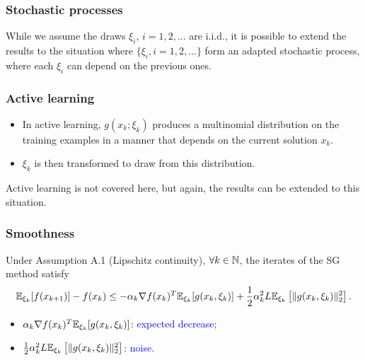 \documentclass[usepdftitle=false, aspectratio=169]{beamer}
\begin{document}
\begin{frame}
\frametitle{Stochastic processes}

While we assume the draws $\xi_i$, $i = 1,2,\ldots$ are i.i.d., it is possible to extend the results to the situation where $\lbrace \xi_i, i = 1,2,\ldots \rbrace$ form an adapted stochastic process, where each $\xi_i$ can depend on the previous ones.

\end{frame}

\begin{frame}
\frametitle{Active learning}

\begin{itemize}
\item 
In active learning, $g(x_k; \xi_k)$ produces a multinomial
distribution on the training examples in a manner that depends on the current solution $x_k$.
\item
$\xi_k$ is then transformed to draw from this distribution.
\end{itemize}

Active learning is not covered here, but again, the results can be extended to this situation.

\end{frame}

\begin{frame}
\frametitle{Smoothness}

\begin{theorem}
Under Assumption A.1 (Lipschitz continuity), $\forall k \in {\mathbb{N}}$, the iterates of the SG method satisfy
$$
{\mathbb{E}}_{\xi_k}[f(x_{k+1})] - f(x_k)
 \leq -\alpha_k \nabla f(x_k)^T{\mathbb{E}}_{\xi_k}[g(x_k,\xi_k)]
+\frac{1}{2} \alpha_k^2 L {\mathbb{E}}_{\xi_k} \left[ \| g(x_k, \xi_k )\|_2^2 \right].
$$
\end{theorem}
\begin{itemize}
	\item $\alpha_k \nabla f(x_k)^T{\mathbb{E}}_{\xi_k}[g(x_k,\xi_k)]$: \textcolor{blue}{expected decrease};
	\item $\frac{1}{2} \alpha_k^2 L {\mathbb{E}}_{\xi_k} \left[ \| g(x_k, \xi_k )\|_2^2 \right]$: \textcolor{blue}{noise}.
\end{itemize}

\end{frame}
\end{document}
